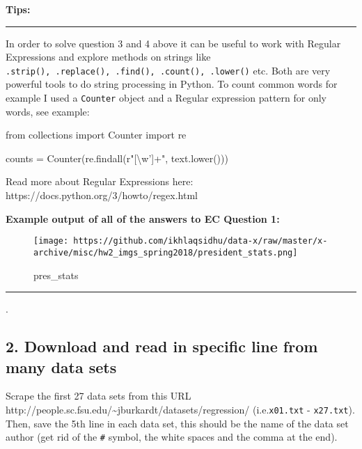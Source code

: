 \documentclass[11pt]{article}
\makeatletter
\def\maxwidth{\ifdim\Gin@nat@width>\linewidth\linewidth
    \else\Gin@nat@width\fi}
\let\Oldincludegraphics\includegraphics
\renewcommand{\includegraphics}[1]{\Oldincludegraphics[width=.8\maxwidth]{#1}}
\newenvironment{Shaded}{}{}
\newcommand{\NormalTok}[1]{{#1}}
\newcommand{\VerbatimStringTok}[1]{\textcolor[rgb]{0.25,0.44,0.63}{{#1}}}
\newcommand{\ImportTok}[1]{{#1}}
\newcommand{\OperatorTok}[1]{\textcolor[rgb]{0.40,0.40,0.40}{{#1}}}
\makeatother
\begin{document}
\textbf{Tips:}

\begin{center}\rule{0.5\linewidth}{\linethickness}\end{center}

In order to solve question 3 and 4 above it can be useful to work with
Regular Expressions and explore methods on strings like
\texttt{.strip(),\ .replace(),\ .find(),\ .count(),\ .lower()} etc. Both
are very powerful tools to do string processing in Python. To count
common words for example I used a \texttt{Counter} object and a Regular
expression pattern for only words, see example:

\begin{Shaded}
\begin{Highlighting}[]
    \ImportTok{from}\NormalTok{ collections }\ImportTok{import}\NormalTok{ Counter}
    \ImportTok{import}\NormalTok{ re}

\NormalTok{    counts }\OperatorTok{=}\NormalTok{ Counter(re.findall(}\VerbatimStringTok{r"[\textbackslash{}w']+"}\NormalTok{, text.lower()))}
\end{Highlighting}
\end{Shaded}

Read more about Regular Expressions here:
https://docs.python.org/3/howto/regex.html

\textbf{Example output of all of the answers to EC Question 1:}

\begin{figure}
\centering
\texttt{[image: https://github.com/ikhlaqsidhu/data-x/raw/master/x-archive/misc/hw2\_imgs\_spring2018/president\_stats.png]}
\caption{pres\_stats}
\end{figure}

\begin{center}\rule{0.5\linewidth}{\linethickness}\end{center}

.

    \subsection{2. Download and read in specific line from many data
sets}\label{download-and-read-in-specific-line-from-many-data-sets}

Scrape the first 27 data sets from this URL
http://people.sc.fsu.edu/\textasciitilde{}jburkardt/datasets/regression/
(i.e.\texttt{x01.txt} - \texttt{x27.txt}). Then, save the 5th line in
each data set, this should be the name of the data set author (get rid
of the \texttt{\#} symbol, the white spaces and the comma at the end).
\end{document}
